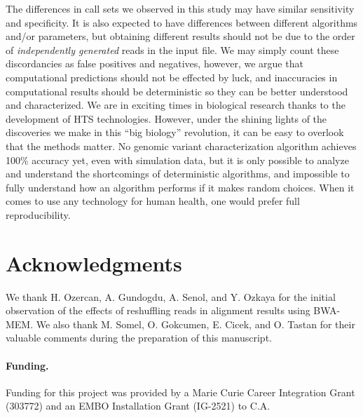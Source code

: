 \documentclass{bioinfo}
\begin{document}
The differences in call sets we observed in this study 
may have similar sensitivity and specificity.
It is also expected to
have differences between different algorithms and/or parameters, but
obtaining different results should not be due to the order of {\it independently generated} reads in the input file. 
We may simply count these discordancies as false positives and negatives, however, 
we argue that computational predictions should not be effected by luck, and inaccuracies in computational results should be deterministic so they can be better understood and characterized.
We are in exciting times in biological research thanks to the development of HTS technologies. However, under the shining lights of the discoveries we make in this ``big biology'' revolution,  
it can be easy to overlook that the methods matter.
No genomic variant characterization algorithm achieves 100\% accuracy yet, even with  simulation data, but it is only possible to analyze and understand the shortcomings of 
deterministic algorithms, and impossible to fully understand how an algorithm performs if it makes random choices. 
When it comes to use any technology for human health, one would prefer full reproducibility. 

\vspace*{-0.75cm}

\section*{Acknowledgments}

We thank H. Ozercan, A. Gundogdu, A. Senol, and Y. Ozkaya for the initial observation of the effects of reshuffling reads in alignment results using BWA-MEM. We also thank M. Somel, 
O. Gokcumen, E. Cicek, and O. Tastan for
their valuable comments during the preparation of this manuscript.

\paragraph{Funding.}
Funding for this project was provided by a Marie Curie Career Integration Grant (303772) and an 
EMBO Installation Grant (IG-2521) to C.A.

\vspace*{-0.75cm}

\footnotesize




\clearpage


\end{document}

